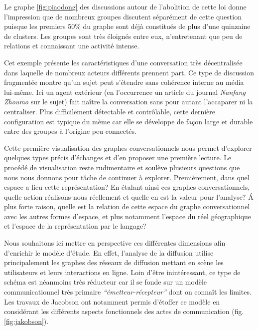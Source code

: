 Le graphe \ref{fig:piaodong} des discussions autour de l{\textquoteright}abolition de cette loi donne l'impression que de nombreux groupes discutent séparément de cette question puisque les premiers 50\% du graphe sont déjà constitués de plus d{\textquoteright}une quinzaine de clusters. Les groupes sont très éloignés entre eux, n{\textquoteright}entretenant que peu de relations et connaissant une activité intense.


Cet exemple présente les caractéristiques d{\textquoteright}une conversation très décentralisée dans laquelle de nombreux acteurs différents prennent part. Ce type de discussion fragmentée montre qu{\textquoteright}un sujet peut s{\textquoteright}étendre sans cohérence interne au média lui-m\^eme. Ici un agent extérieur (en l{\textquoteright}occurrence un article du journal \textit{Nanfang Zhoumo }sur le sujet) fait na\^itre la conversation sans pour autant l{\textquoteright}accaparer ni la centraliser. Plus difficilement détectable et contr\^olable, cette dernière configuration est typique du mème car elle se développe de fa\c{c}on large et durable entre des groupes à l{\textquoteright}origine peu connectés.

Cette première visualisation des graphes conversationnels nous permet d{\textquoteright}explorer quelques types précis d{\textquoteright}échanges et d{\textquoteright}en proposer une première lecture. Le procédé de visualisation reste rudimentaire et soulève plusieurs questions que nous nous donnons pour t\^ache de continuer à explorer. Premièrement, dans quel espace a lieu cette représentation? En étalant ainsi ces graphes conversationnels, quelle action réalisons-nous réellement et quelle en est la valeur pour l{\textquoteright}analyse? \'A plus forte raison, quelle est la relation de cette espace du graphe conversationnel avec les autres formes d{\textquoteright}espace, et plus notamment l{\textquoteright}espace du réel géographique et l{\textquoteright}espace de la représentation par le langage?

Nous souhaitons ici mettre en perspective ces différentes dimensions afin d{\textquoteright}enrichir le modèle d{\textquoteright}étude. En effet, l{\textquoteright}analyse de la diffusion utilise principalement les graphes des réseaux de diffusion mettant en scène les utilisateurs et leurs interactions en ligne. Loin d{\textquoteright}\^etre inintéressant, ce type de schéma est néanmoins très réducteur car il se fonde sur un modèle communicationnel très primaire \textit{{\textquotedblleft}émetteur-récepteur{\textquotedblright} }dont on conna\^it les limites. Les travaux de Jacobson ont notamment permis d{\textquoteright}étoffer ce modèle en considérant les différents aspects fonctionnels des actes de communication (fig. \ref{fig:jakobson}).


